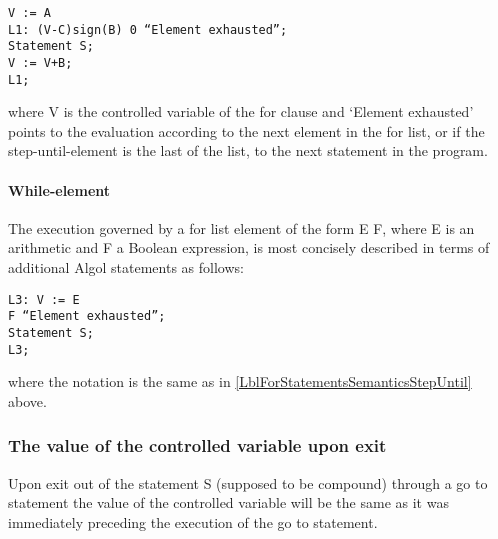 \documentclass[a4paper,11pt]{article}
\begin{document}
\begin{flushleft}
\texttt{\hspace{1.0cm}V := A\\
L1:   (V-C)\mtim{}sign(B) \mgt{} 0   ``Element exhausted'';\\
\hspace{1.0cm}Statement S;\\
\hspace{1.0cm}V := V+B;\\
\hspace{1.0cm} L1;}\\
\end{flushleft}

where V is the controlled variable of the for clause and `Element
exhausted' points to the evaluation according to the next element in
the for list, or if the step-until-element is the last of the list, to
the next statement in the program.

\paragraph{While-element}
\label{LblForStatementsSemanticsWhileElement}

The execution governed by a for list element of the form E
 F, where E is an arithmetic and F a Boolean expression,
is most concisely described in terms of additional Algol statements as
follows:

\begin{flushleft}
\texttt{L3:  V := E\\
  \hspace{1.0cm} \mlnot{} F   ``Element exhausted'';\\
  \hspace{1.0cm}Statement S;\\
  \hspace{1.0cm} L3;}\\
\end{flushleft}

where the notation is the same as in
\ref{LblForStatementsSemanticsStepUntil} above.


\subsubsection{The value of the controlled variable upon exit}

Upon exit out of the statement S (supposed to be compound) through a
go to statement the value of the controlled variable will be the same
as it was immediately preceding the execution of the go to statement.
\end{document}
